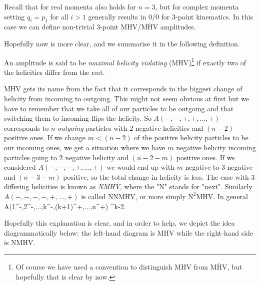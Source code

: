 \br 
    Recall that for real momenta  also holds for $n=3$, but for complex momenta setting $q_i=p_1$ for all $i>1$ generally results in $0/0$ for 3-point kinematics. In this case we can define non-trivial 3-point MHV/$\overline{\text{MHV}}$ amplitudes.
\er 

Hopefully now  is more clear, and we summarise it in the following definition. 

    An amplitude is said to be \textit{maximal helicity violating} (MHV)\footnote{Of course we have used a convention to distinguish MHV from $\overline{\text{MHV}}$, but hopefully that is clear by now.} if exactly two of the helicities differ from the rest. 
\ed 

MHV gets its name from the fact that it corresponds to the biggest change of helicity from incoming to outgoing. This might not seem obvious at first but we have to remember that we take all of our particles to be outgoing and that switching them to incoming flips the helicity. So $A(-,-,+,+,...,+)$ corresponds to $n$ \textit{outgoing} particles with 2 negative helicities and $(n-2)$ positive ones. If we change $m<(n-2)$ of the positive helicity particles to be our incoming ones, we get a situation where we have $m$ negative helicity incoming particles going to $2$ negative helicity and $(n-2-m)$ positive ones. If we considered $A(-,-,-,+,...,+)$ we would end up with $m$ negative to $3$ negative and $(n-3-m)$ positive, so the total change in helicity is less. The case with 3 differing helicities is known as \textit{NMHV}, where the "N" stands for "next". Similarly $A(-,-,-,-,+,...,+)$ is called NNMHV, or more simply $\text{N}^2$MHV. In general
\bse 
    A(1^-,2^-,...,k^-,(k+1)^+,...,n^+) \qquad {}^{k-2}.
\ese 


Hopefully this explanation is clear, and in order to help, we depict the idea diagrammatically below: the left-hand diagram is MHV while the right-hand side is NMHV.

